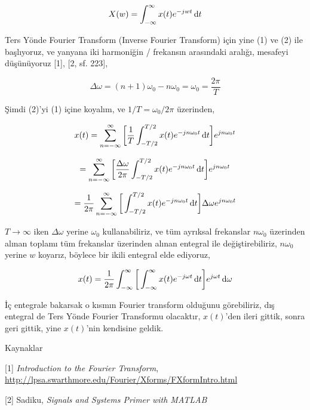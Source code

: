 \documentclass[12pt,fleqn]{article}\usepackage{../../common}
\begin{document}
$$ X(w) = \int_{-\infty}^{\infty} x(t) e^{-jwt} \,\mathrm{d} t$$

Ters Yönde Fourier Transform (Inverse Fourier Transform) için yine (1) ve
(2) ile başlıyoruz, ve yanyana iki harmoniğin / frekansın arasındaki
aralığı, mesafeyi düşünüyoruz [1], [2, sf. 223],

$$ \Delta \omega = (n+1) \omega_0 - n \omega_0 = \omega_0 = \frac{2\pi}{T} $$

Şimdi (2)'yi (1) içine koyalım, ve $1/T = \omega_0 / 2\pi$ üzerinden,

$$ 
x(t) = \sum_{n=-\infty}^{\infty} \bigg[ 
\frac{1}{T} \int_{-T/2}^{T/2} x(t) e ^{-jn\omega_0 t} \,\mathrm{d} t
\bigg]  e ^{jn\omega_0 t}
$$


$$ 
= \sum_{n=-\infty}^{\infty} \bigg[ 
\frac{\Delta \omega}{2\pi} \int_{-T/2}^{T/2} x(t) e ^{-jn\omega_0 t} \,\mathrm{d} t
\bigg]  e ^{jn\omega_0 t}
$$


$$ 
= \frac{1}{2\pi} \sum_{n=-\infty}^{\infty} \bigg[ 
\int_{-T/2}^{T/2} x(t) e ^{-jn\omega_0 t} \,\mathrm{d} t
\bigg] \Delta \omega e ^{jn\omega_0 t}
$$

$T \to \infty$ iken $\Delta \omega$ yerine $\omega_0$ kullanabiliriz, ve
tüm ayrıksal frekanslar $n\omega_0$ üzerinden alınan toplamı tüm frekanslar
üzerinden alınan entegral ile değiştirebiliriz, $n\omega_0$ yerine $w$
koyarız, böylece bir ikili entegral elde ediyoruz, 

$$ x(t) = \frac{1}{2\pi} \int_{-\infty}^{\infty} \bigg[
\int_{-\infty}^{\infty} x(t) e ^{-j\omega t} \,\mathrm{d} t
\bigg] e ^{j\omega t}  \,\mathrm{d} \omega
$$

İç entegrale bakarsak o kısmın Fourier transform olduğunu görebiliriz, dış
entegral de Ters Yönde Fourier Transformu olacaktır, $x(t)$'den ileri
gittik, sonra geri gittik, yine $x(t)$'nin kendisine geldik.


Kaynaklar

[1] {\em Introduction to the Fourier Transform}, \url{http://lpsa.swarthmore.edu/Fourier/Xforms/FXformIntro.html}

[2] Sadiku, {\em Signals and Systems Primer with MATLAB}
\end{document}
